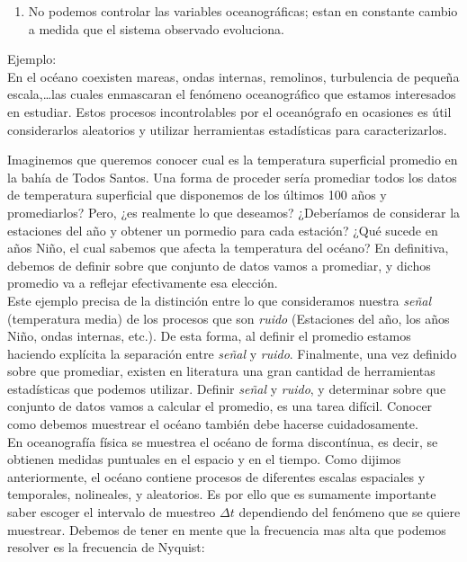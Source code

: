 \documentclass[
]{agujournal2019}
\providecommand{\tightlist}{%
  \setlength{\itemsep}{0pt}\setlength{\parskip}{0pt}}\usepackage{longtable,booktabs,array}
\begin{document}
\begin{enumerate}
\def\labelenumi{\arabic{enumi}.}
\setcounter{enumi}{2}
\tightlist
\item
  No podemos controlar las variables oceanográficas; estan en constante
  cambio a medida que el sistema observado evoluciona.
\end{enumerate}

\vspace{0.5cm}

Ejemplo:\\
En el océano coexisten mareas, ondas internas, remolinos, turbulencia de
pequeña escala,\ldots las cuales enmascaran el fenómeno oceanográfico
que estamos interesados en estudiar. Estos procesos incontrolables por
el oceanógrafo en ocasiones es útil considerarlos aleatorios y utilizar
herramientas estadísticas para caracterizarlos.

Imaginemos que queremos conocer cual es la temperatura superficial
promedio en la bahía de Todos Santos. Una forma de proceder sería
promediar todos los datos de temperatura superficial que disponemos de
los últimos 100 años y promediarlos? Pero, ¿es realmente lo que
deseamos? ¿Deberíamos de considerar la estaciones del año y obtener un
pormedio para cada estación? ¿Qué sucede en años Niño, el cual sabemos
que afecta la temperatura del océano? En definitiva, debemos de definir
sobre que conjunto de datos vamos a promediar, y dichos promedio va a
reflejar efectivamente esa elección.\\

Este ejemplo precisa de la distinción entre lo que consideramos nuestra
\emph{señal} (temperatura media) de los procesos que son \emph{ruido}
(Estaciones del año, los años Niño, ondas internas, etc.). De esta
forma, al definir el promedio estamos haciendo explícita la separación
entre \emph{señal} y \emph{ruido}. Finalmente, una vez definido sobre
que promediar, existen en literatura una gran cantidad de herramientas
estadísticas que podemos utilizar. Definir \emph{señal} y \emph{ruido},
y determinar sobre que conjunto de datos vamos a calcular el promedio,
es una tarea difícil. Conocer como debemos muestrear el océano también
debe hacerse cuidadosamente.\\

En oceanografía física se muestrea el océano de forma discontínua, es
decir, se obtienen medidas puntuales en el espacio y en el tiempo. Como
dijimos anteriormente, el océano contiene procesos de diferentes escalas
espaciales y temporales, nolineales, y aleatorios. Es por ello que es
sumamente importante saber escoger el intervalo de muestreo
\(\Delta{t}\) dependiendo del fenómeno que se quiere muestrear. Debemos
de tener en mente que la frecuencia mas alta que podemos resolver es la
frecuencia de Nyquist:
\end{document}
